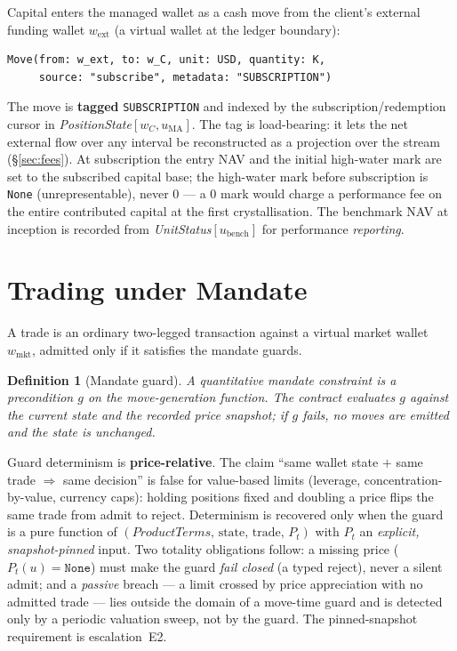 \documentclass[11pt,a4paper]{article}
\newtheorem{definition}{Definition}[section]
\begin{document}
Capital enters the managed wallet as a cash move from the client's external funding wallet
$w_{\text{ext}}$ (a virtual wallet at the ledger boundary):
\begin{lstlisting}
Move(from: w_ext, to: w_C, unit: USD, quantity: K,
     source: "subscribe", metadata: "SUBSCRIPTION")
\end{lstlisting}
The move is \textbf{tagged} \texttt{SUBSCRIPTION} and indexed by the subscription/redemption
cursor in \textit{PositionState}$[w_C,u_{\mathrm{MA}}]$. The tag is load-bearing: it lets the net
external flow over any interval be reconstructed as a projection over the stream
(\S\ref{sec:fees}). At subscription the entry NAV and the initial high-water mark are set to the
subscribed capital base; the high-water mark before subscription is \texttt{None}
(unrepresentable), never $0$ --- a $0$ mark would charge a performance fee on the entire
contributed capital at the first crystallisation. The benchmark NAV at inception is recorded from
\textit{UnitStatus}$[u_{\mathrm{bench}}]$ for performance \emph{reporting}.

\section{Trading under Mandate}
\label{sec:trading}

A trade is an ordinary two-legged transaction against a virtual market wallet $w_{\text{mkt}}$,
admitted only if it satisfies the mandate guards.

\begin{definition}[Mandate guard]
A quantitative mandate constraint is a precondition $g$ on the move-generation function. The
contract evaluates $g$ against the current state and the recorded price snapshot; if $g$ fails,
\emph{no} moves are emitted and the state is unchanged.
\end{definition}

\noindent Guard determinism is \textbf{price-relative}. The claim ``same wallet state $+$ same
trade $\Rightarrow$ same decision'' is false for value-based limits (leverage,
concentration-by-value, currency caps): holding positions fixed and doubling a price flips the
same trade from admit to reject. Determinism is recovered only when the guard is a pure function
of $(\textit{ProductTerms},\,\text{state},\,\text{trade},\,P_t)$ with $P_t$ an \emph{explicit,
snapshot-pinned} input. Two totality obligations follow: a missing price
($P_t(u)=\texttt{None}$) must make the guard \emph{fail closed} (a typed reject), never a silent
admit; and a \emph{passive} breach --- a limit crossed by price appreciation with no admitted
trade --- lies outside the domain of a move-time guard and is detected only by a periodic
valuation sweep, not by the guard. The pinned-snapshot requirement is escalation~E2.
\end{document}
